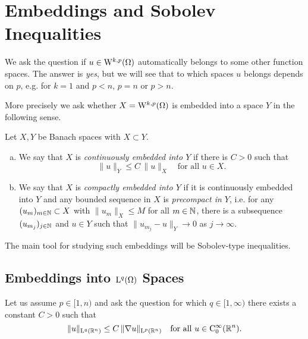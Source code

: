 \chapter{Embeddings and Sobolev Inequalities}

We ask the question if $u \in \mathrm{W}^{k,p}(\Omega)$ automatically belongs to some other function spaces.
The answer is \emph{yes}, but we will see that to which spaces $u$ belongs depends on $p$, e.g. for $k = 1$ and $p < n$, $p = n$ or $p > n$.

More precisely we ask whether $X = \mathrm{W}^{k,p}(\Omega)$ is embedded into a space $Y$ in the following sense.

\begin{defn}
  Let $X, Y$ be Banach spaces with $X \subset Y$.
  \begin{enumerate}[a)]
    \item We say that $X$ is \emph{continuously embedded into $Y$} if there is $C > 0$ such that
      $$
      \|u\|_Y \leq C \, \|u\|_X \quad\text{for all } u \in X.
      $$
    \item We say that $X$ is \emph{compactly embedded into $Y$} if it is continuously embedded into $Y$ and any bounded sequence in $X$ is \emph{precompact in $Y$}, i.e. for any $(u_m)_{m \in \mathbb{N}} \subset X$ with $\|u_m\|_X \leq M$ for all $m \in \mathbb{N}$, there is a subsequence $(u_{m_j})_{j \in \mathbb{N}}$ and $u \in Y$ such that $\|u_{m_j} - u\|_Y \to 0$ as $j \to \infty$.
  \end{enumerate}
\end{defn}

The main tool for studying such embeddings will be Sobolev-type inequalities.

\section{Embeddings into \texorpdfstring{$\mathrm{L}^q(\Omega)$}{L\textasciicircum q(Omega)} Spaces}

Let us assume $p \in [1,n)$ and ask the question for which $q \in [1,\infty)$ there exists a constant $C > 0$ such that
\begin{equation}
  \label{eq:sobolevTypeIneq}
  \|u\|_{\mathrm{L}^q(\mathbb{R}^n)} \leq C \, \|\nabla u\|_{\mathrm{L}^p(\mathbb{R}^n)} \quad\text{for all } u \in \mathrm{C}_0^\infty(\mathbb{R}^n). 
\end{equation}

